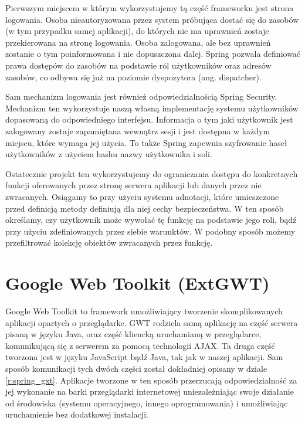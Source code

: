 \documentclass[licencjacka]{pracamgr}
\begin{document}
Pierwszym miejscem w którym wykorzystujemy tą część frameworku jest strona logowania. Osoba nieautoryzowana przez system próbująca dostać się do zasobów (w tym przypadku samej aplikacji), do których nie ma uprawnień zostaje przekierowana na stronę logowania. Osoba zalogowana, ale bez uprawnień zostanie o tym poinformowana i nie dopuszczona dalej. Spring pozwala definiować prawa dostępów do zasobów na podstawie ról użytkowników oraz adresów zasobów, co odbywa się już na poziomie dyspozytora (ang. dispatcher).

Sam mechanizm logowania jest również odpowiedzialnością Spring Security. Mechanizm ten wykorzystuje naszą własną implementację systemu użytkowników dopasowaną do odpowiedniego interfejsu. Informacja o tym jaki użytkownik jest zalogowany zostaje zapamiętana wewnątrz sesji i jest dostępna w każdym miejscu, które wymaga jej użycia. To także Spring zapewnia szyfrowanie haseł użytkowników z użyciem hashu nazwy użytkownika i soli.

Ostatecznie projekt ten wykorzystujemy do ograniczania dostępu do konkretnych funkcji oferowanych przez stronę serwera aplikacji lub danych przez nie zwracanych. Osiągamy to przy użyciu systemu adnotacji, które umieszczone przed definicją metody definiują dla niej cechy bezpieczeństwa. W ten sposób określamy, czy użytkownik może wywołać tę funkcję na podstawie jego roli, bądź przy użyciu zdefiniowanych przez siebie warunktów. W podobny sposób możemy przefiltrować kolekcję obiektów zwracanych przez funkcję. 

\section{Google Web Toolkit (ExtGWT)}

Google Web Toolkit to framework umożliwiający tworzenie skomplikowanych aplikacji opartych o przeglądarke. GWT rodziela samą aplikację na część serwera pisaną w języku Java, oraz część kliencką uruchamianą w przeglądarce, komunikującą się z serwerem za pomocą technologii AJAX. Ta druga część tworzona jest w języku JavaScript bądź Java, tak jak w naszej aplikacji. Sam sposób komunikacji tych dwóch części został dokładniej opisany w dziale \ref{r:spring_gxt}. Aplikacje tworzone w ten sposób przerzucają odpowiedzialność za jej wykonanie na barki przeglądarki internetowej uniezależniając swoje działanie od środowiska (systemu operacyjnego, innego oprogramowania) i umożliwiając uruchamienie bez dodatkowej instalacji.
\end{document}
